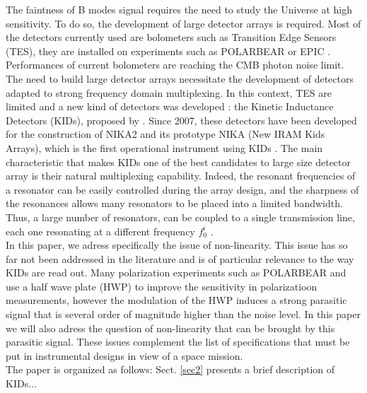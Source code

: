 The faintness of B modes signal requires the need to study the Universe at high sensitivity. To do so, the development of large detector arrays is required. Most of the detectors currently used are bolometers such as Transition Edge Sensors (TES), they are installed on experiments such as POLARBEAR \citep{2014ApJ...794..171P} or EPIC \citep{2008arXiv0805.4207B}. Performances of current bolometers are reaching the CMB photon noise limit. The need to build large detector arrays necessitate the development of detectors adapted to strong frequency domain multiplexing. In this context, TES are limited and a new kind of detectors was developed : the Kinetic Inductance Detectors (KIDs), proposed by \citet{2003Natur.425..817D}. Since 2007, these detectors have been developed for the construction of NIKA2 and its prototype NIKA (New IRAM Kids Arrays), which is the first operational instrument using KIDs \citep{2010A&A...521A..29M,2016JLTP..184..816C}. The main characteristic that makes KIDs one of the best candidates to large size detector array is their natural multiplexing capability. Indeed, the resonant frequencies of a resonator can be easily controlled during the array design, and the sharpness of the resonances allows many resonators to be placed into a limited bandwidth. Thus, a large number of resonators, can be coupled to a single transmission line, each one resonating at a different frequency $f_{0}^{i}$ \citep{2010A&A...521A..29M,Calvo2008}.\\
In this paper, we adress specifically the issue of non-linearity. This issue has so far not been addressed in the literature and is of particular relevance to the way KIDs are read out. Many polarization experiments such as POLARBEAR \citep{2017JCAP...05..008T} and  \citep{2017A&A...599A..34R} use a half wave plate (HWP) to improve the sensitivity in polarizatioon measurements, however the modulation of the HWP induces a strong parasitic signal that is several order of magnitude higher than the noise level. In this paper we will also adress the question of non-linearity that can be brought by this parasitic signal. These issues complement the list of specifications that must be put in instrumental designs in view of a space mission.\\
The paper is organized as follows:
Sect. \ref{sec2} presents a brief description of KIDs...
